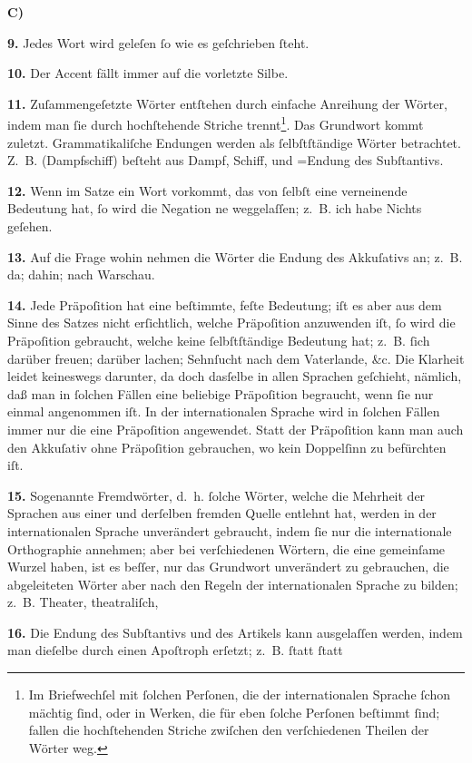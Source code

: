 \begin{center}
\Large \bf C) 
\end{center}

\enlargethispage{-\baselineskip}
{\fr \large
    \textbf{9.} Jedes Wort wird geleſen ſo wie es geſchrieben ſteht.
    
    \textbf{10.} Der Accent fällt immer auf die vorletzte Silbe.
    
    \textbf{11.} Zuſammengeſetzte Wörter entſtehen durch einfache Anreihung der Wörter, indem man ſie durch hochſtehende Striche trennt\footnote{\fr \small Im Briefwechſel mit ſolchen Perſonen, die der internationalen Sprache ſchon mächtig ſind, oder in Werken, die für eben ſolche Perſonen beſtimmt ſind; fallen die hochſtehenden Striche zwiſchen den verſchiedenen Theilen der Wörter weg.}. Das Grundwort kommt zuletzt. Grammatikaliſche Endungen werden als ſelbſtſtändige Wörter betrachtet. Z.~B.  (Dampfschiff) beſteht aus  Dampf,  Schiff, und =Endung des Subſtantivs.

    \textbf{12.} Wenn im Satze ein Wort vorkommt, das von ſelbſt eine verneinende Bedeutung hat, ſo wird die Negation ne weggelaſſen; z.~B.  ich habe Nichts geſehen.
    
    \textbf{13.} Auf die Frage \glqq{}wohin\grqq{} nehmen die Wörter die Endung des Akkuſativs an; z.~B.  da;  dahin;  nach Warschau.
    
    \textbf{14.} Jede Präpoſition hat eine beſtimmte, feſte Bedeutung; iſt es aber aus dem Sinne des Satzes nicht erſichtlich, welche Präpoſition anzuwenden iſt, ſo wird die Präpoſition  gebraucht, welche keine ſelbſtſtändige Bedeutung hat; z.~B.  ſich darüber freuen;  darüber lachen;  Sehnſucht nach dem Vaterlande, \&c. Die Klarheit leidet keineswegs darunter, da doch dasſelbe in allen Sprachen geſchieht, nämlich, daß man in ſolchen Fällen eine beliebige Präpoſition begraucht, wenn ſie nur einmal angenommen iſt. In der internationalen Sprache wird in ſolchen Fällen immer nur die eine Präpoſition  angewendet. Statt der Präpoſition  kann man auch den Akkuſativ ohne Präpoſition gebrauchen, wo kein Doppelſinn zu befürchten iſt.
    
    \textbf{15.} Sogenannte Fremdwörter, d.~h. ſolche Wörter, welche die Mehrheit der Sprachen aus einer und derſelben fremden Quelle entlehnt hat, werden in der internationalen Sprache unverändert gebraucht, indem ſie nur die internationale Orthographie annehmen; aber bei verſchiedenen Wörtern, die eine gemeinſame Wurzel haben, ist es beſſer, nur das Grundwort unverändert zu gebrauchen, die abgeleiteten Wörter aber  nach den Regeln der internationalen Sprache zu bilden; z.~B. Theater,  theatraliſch, 
    
    \textbf{16.} Die Endung des Subſtantivs und des Artikels kann ausgelaſſen werden, indem man dieſelbe durch einen Apoſtroph erſetzt; z.~B.  ſtatt   ſtatt  
}
\newpage
